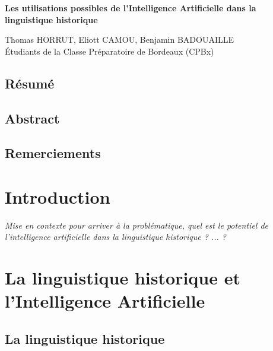 \documentclass[12pt, french, twoside]{report}
\begin{document}
\begin{titlepage}
    \centering
    \vspace*{\fill}

    \huge\bfseries
    Les utilisations possibles de l'Intelligence Artificielle dans la linguistique historique
    
    \vspace*{1.5cm}
    \large Thomas HORRUT,\; Eliott CAMOU,\; Benjamin BADOUAILLE\\
    Étudiants de la Classe Préparatoire de Bordeaux (CPBx) 
    
    \vspace*{\fill}
\end{titlepage}

\null
\setcounter{page}{1}
\thispagestyle{empty}
\newpage %
\section{Résumé}
\section{Abstract}
\section{Remerciements}


\tableofcontents
\listoffigures
\listoftables %

\printglossary %

\chapter{Introduction}
\textit{Mise en contexte pour arriver à la problématique, quel est le potentiel de l'intelligence artificielle dans la linguistique historique ? ... ?}

\chapter{La linguistique historique et l'Intelligence Artificielle}
\section{La linguistique historique}
\end{document}

